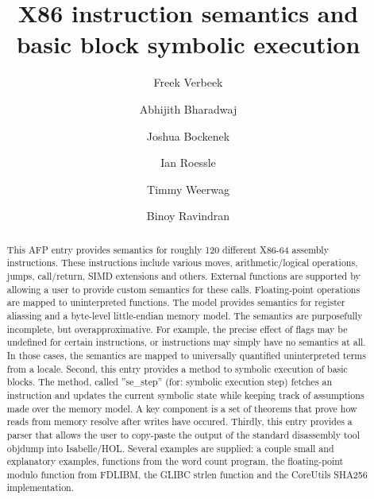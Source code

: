 \documentclass[11pt,a4paper]{article}
\begin{document}
\title{X86 instruction semantics and basic block symbolic execution}
\author{Freek Verbeek
  \and Abhijith Bharadwaj
  \and Joshua Bockenek
  \and Ian Roessle
  \and Timmy Weerwag
  \and Binoy Ravindran}
\maketitle

\begin{abstract}
This AFP entry provides semantics for roughly 120 different X86-64 assembly instructions. These instructions include various moves, arithmetic/logical operations, jumps, call/return, SIMD extensions and others. External functions are supported by allowing a user to provide custom semantics for these calls. Floating-point operations are mapped to uninterpreted functions. The model provides semantics for register aliassing and a byte-level little-endian memory model. The semantics are purposefully incomplete, but overapproximative. For example, the precise effect of flags may be undefined for certain instructions, or instructions may simply have no semantics at all. In those cases, the semantics are mapped to universally quantified uninterpreted terms from a locale. Second, this entry provides a method to symbolic execution of basic blocks. The method, called ''se\_step'' (for: symbolic execution step) fetches an instruction and updates the current symbolic state while keeping track of assumptions made over the memory model. A key component is a set of theorems that prove how reads from memory resolve after writes have occured. Thirdly, this entry provides a parser that allows the user to copy-paste the output of the standard disassembly tool objdump into Isabelle/HOL. Several examples are supplied: a couple small and explanatory examples, functions from the word count program, the floating-point modulo function from FDLIBM, the GLIBC strlen function and the CoreUtils SHA256 implementation.
\end{abstract}

\tableofcontents


\cite{LNCS2283}




\end{document}
